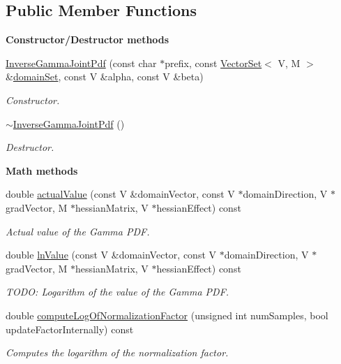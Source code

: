 \subsection*{Public Member Functions}
\begin{Indent}{\bf Constructor/\-Destructor methods}\par
\begin{DoxyCompactItemize}
\item 
\hyperlink{class_q_u_e_s_o_1_1_inverse_gamma_joint_pdf_a2f59c9b8f9f43dd3438a557db128955f}{Inverse\-Gamma\-Joint\-Pdf} (const char $\ast$prefix, const \hyperlink{class_q_u_e_s_o_1_1_vector_set}{Vector\-Set}$<$ V, M $>$ \&\hyperlink{class_q_u_e_s_o_1_1_base_scalar_function_ad0937628825249dd36ded3ce0c7959ac}{domain\-Set}, const V \&alpha, const V \&beta)
\begin{DoxyCompactList}\small\item\em Constructor. \end{DoxyCompactList}\item 
\hyperlink{class_q_u_e_s_o_1_1_inverse_gamma_joint_pdf_ae7d5ae604b17eeb3386e98fb01072cd7}{$\sim$\-Inverse\-Gamma\-Joint\-Pdf} ()
\begin{DoxyCompactList}\small\item\em Destructor. \end{DoxyCompactList}\end{DoxyCompactItemize}
\end{Indent}
\begin{Indent}{\bf Math methods}\par
\begin{DoxyCompactItemize}
\item 
double \hyperlink{class_q_u_e_s_o_1_1_inverse_gamma_joint_pdf_a1e0dbb40992578a11b40d0755f59ef2e}{actual\-Value} (const V \&domain\-Vector, const V $\ast$domain\-Direction, V $\ast$grad\-Vector, M $\ast$hessian\-Matrix, V $\ast$hessian\-Effect) const 
\begin{DoxyCompactList}\small\item\em Actual value of the Gamma P\-D\-F. \end{DoxyCompactList}\item 
double \hyperlink{class_q_u_e_s_o_1_1_inverse_gamma_joint_pdf_a08dbbb7054026fcf4d429870cbe5d36f}{ln\-Value} (const V \&domain\-Vector, const V $\ast$domain\-Direction, V $\ast$grad\-Vector, M $\ast$hessian\-Matrix, V $\ast$hessian\-Effect) const 
\begin{DoxyCompactList}\small\item\em T\-O\-D\-O\-: Logarithm of the value of the Gamma P\-D\-F. \end{DoxyCompactList}\item 
double \hyperlink{class_q_u_e_s_o_1_1_inverse_gamma_joint_pdf_a812888fe10ba1f89ee6871dc9272140e}{compute\-Log\-Of\-Normalization\-Factor} (unsigned int num\-Samples, bool update\-Factor\-Internally) const 
\begin{DoxyCompactList}\small\item\em Computes the logarithm of the normalization factor. \end{DoxyCompactList}\end{DoxyCompactItemize}
\end{Indent}
